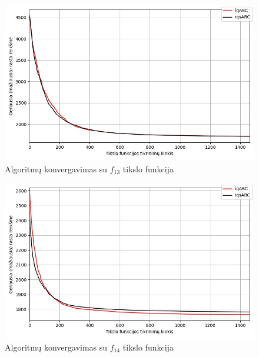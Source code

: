 \documentclass{VUMIFKompMagistrinis}
\begin{document}
\begin{landscape}
\begin{multicols}{2}
\begin{figure}[H]
    \centering
    \includegraphics[scale=0.5]{img/2kg/f13.jpg}
    \caption{Algoritmų konvergavimas su $f_{13}$ tikslo funkcija}
    \label{img:vkonf13}
\end{figure}

\begin{figure}[H]
    \centering
    \includegraphics[scale=0.5]{img/2kg/f14.jpg}
    \caption{Algoritmų konvergavimas su $f_{14}$ tikslo funkcija}
    \label{img:vkonf14}
\end{figure}


\end{multicols}



\end{landscape}
\end{document}
